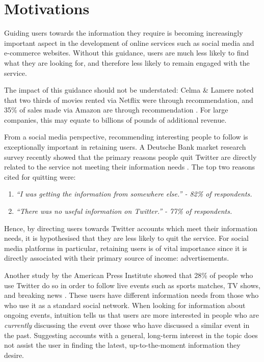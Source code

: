\documentclass{l4proj}
\begin{document}
\section{Motivations}
Guiding users towards the information they require is becoming increasingly important aspect in the development of online services such as social media and e-commerce websites. Without this guidance, users are much less likely to find what they are looking for, and therefore less likely to remain engaged with the service.

The impact of this guidance should not be understated: Celma \& Lamere noted that two thirds of movies rented via Netflix were through recommendation, and 35\% of sales made via Amazon are through recommendation \cite{celmaLamere}. For large companies, this may equate to billions of pounds of additional revenue.

From a social media perspective, recommending interesting people to follow is exceptionally important in retaining users. A Deutsche Bank market research survey recently showed that the primary reasons people quit Twitter are directly related to the service not meeting their information needs \cite{leavingTwitter}. The top two reasons cited for quitting were:

\begin{enumerate}
    \item \textit{``I was getting the information from somewhere else.'' - 82\% of respondents. }
    \item \textit{``There was no useful information on Twitter.'' - 77\% of respondents.}
\end{enumerate}

Hence, by directing users towards Twitter accounts which meet their information needs, it is hypothesised that they are less likely to quit the service. For social media platforms in particular, retaining users is of vital importance since it is directly associated with their primary source of income: advertisements.

Another study by the American Press Institute showed that 28\% of people who use Twitter do so in order to follow live events such as sports matches, TV shows, and breaking news \cite{twitterNews}. These users have different information needs from those who who use it as a standard social network. When looking for information about ongoing events, intuition tells us that users are more interested in people who are \textit{currently} discussing the event over those who have discussed a similar event in the past. Suggesting accounts with a general, long-term interest in the topic does not assist the user in finding the latest, up-to-the-moment information they desire.
\end{document}

